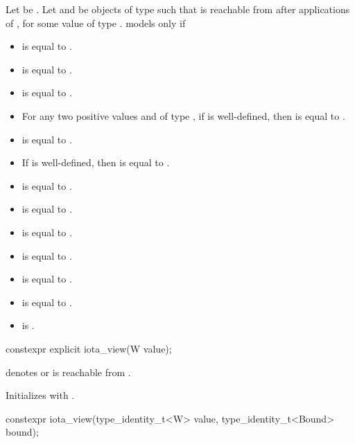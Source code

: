 Let  be .
Let  and  be objects of type  such that
 is reachable from 
after  applications of ,
for some value  of type .
 models  only if
\begin{itemize}
\item {} is equal to .
\item {} is equal to .
\item {} is equal to .
\item For any two positive values
   and  of type ,
  if  is well-defined, then
   is equal to .
\item {} is equal to .
\item If  is well-defined, then
   is equal to .
\item {} is equal to .
\item {} is equal to .
\item {} is equal to .
\item {} is equal to .
\item {} is equal to .
\item {} is equal to .
\item {} is .
\end{itemize}

%
\begin{itemdecl}
constexpr explicit iota_view(W value);
\end{itemdecl}

\begin{itemdescr}
\pnum
\expects
{} denotes  or
 is reachable from .

\pnum
\effects
Initializes  with .
\end{itemdescr}

%
\begin{itemdecl}
constexpr iota_view(type_identity_t<W> value, type_identity_t<Bound> bound);
\end{itemdecl}

